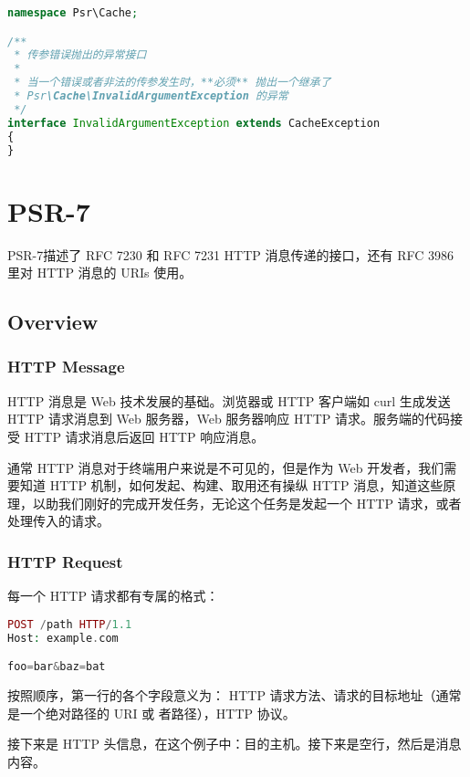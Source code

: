\begin{lstlisting}[language=PHP]
namespace Psr\Cache;

/**
 * 传参错误抛出的异常接口
 *
 * 当一个错误或者非法的传参发生时，**必须** 抛出一个继承了
 * Psr\Cache\InvalidArgumentException 的异常
 */
interface InvalidArgumentException extends CacheException
{
}
\end{lstlisting}


\chapter{PSR-7}

PSR-7描述了 RFC 7230 和 RFC 7231 HTTP 消息传递的接口，还有 RFC 3986 里对 HTTP 消息的 URIs 使用。


\section{Overview}

\subsection{HTTP Message}


HTTP 消息是 Web 技术发展的基础。浏览器或 HTTP 客户端如 curl 生成发送 HTTP 请求消息到 Web 服务器，Web 服务器响应 HTTP 请求。服务端的代码接受 HTTP 请求消息后返回 HTTP 响应消息。

通常 HTTP 消息对于终端用户来说是不可见的，但是作为 Web 开发者，我们需要知道 HTTP 机制，如何发起、构建、取用还有操纵 HTTP 消息，知道这些原理，以助我们刚好的完成开发任务，无论这个任务是发起一个 HTTP 请求，或者处理传入的请求。


\subsection{HTTP Request}


每一个 HTTP 请求都有专属的格式：



\begin{lstlisting}[language=PHP]
POST /path HTTP/1.1
Host: example.com

foo=bar&baz=bat
\end{lstlisting}


按照顺序，第一行的各个字段意义为： HTTP 请求方法、请求的目标地址（通常是一个绝对路径的 URI 或 者路径），HTTP 协议。

接下来是 HTTP 头信息，在这个例子中：目的主机。接下来是空行，然后是消息内容。

